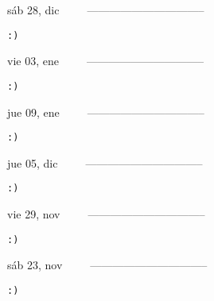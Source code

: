 \documentclass[letterpaper,10pt]{article}
\begin{document}
\begin{multicols}{3}
{sáb 28, dic\ \ \ \ \ --------------------------------}
\begin{flushright}\begin{small}\texttt{:)}\end{small}\end{flushright}
\vfill
{vie 03, ene\ \ \ \ \ --------------------------------}
\begin{flushright}\begin{small}\texttt{:)}\end{small}\end{flushright}\par
\vfill
{jue 09, ene\ \ \ \ \ --------------------------------}
\begin{flushright}\begin{small}\texttt{:)}\end{small}\end{flushright}\par
\vfill
\end{multicols}
\vspace{1.05cm}

\begin{multicols}{3}
{jue 05, dic\ \ \ \ \ --------------------------------}
\begin{flushright}\begin{small}\texttt{:)}\end{small}\end{flushright}
\vfill
{vie 29, nov\ \ \ \ \ --------------------------------}
\begin{flushright}\begin{small}\texttt{:)}\end{small}\end{flushright}\par
\vfill
{sáb 23, nov\ \ \ \ \ --------------------------------}
\begin{flushright}\begin{small}\texttt{:)}\end{small}\end{flushright}\par
\vfill
\end{multicols}
\vspace{1.05cm}
\end{document}
